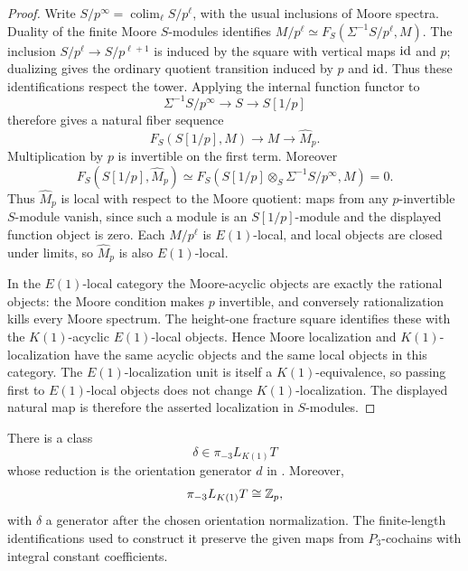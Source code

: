 \begin{proof}
Write \(S/p^\infty=\operatorname*{colim}_\ell S/p^\ell\), with
the usual inclusions of Moore spectra.  Duality of the finite Moore
\(S\)-modules identifies
\(M/p^\ell\simeq F_S(\Sigma^{-1}S/p^\ell,M)\).  The inclusion
\(S/p^\ell\to S/p^{\ell+1}\) is induced by the square with vertical
maps \(\mathrm{id}\) and \(p\); dualizing gives the ordinary quotient
transition induced by \(p\) and \(\mathrm{id}\).  Thus these
identifications respect the tower.  Applying the internal function functor to
\[
 \Sigma^{-1}S/p^\infty\longrightarrow S\longrightarrow S[1/p]
\]
therefore gives a natural fiber sequence
\[
 F_S(S[1/p],M)\longrightarrow M\longrightarrow\widehat M_p.
\]
Multiplication by \(p\) is invertible on the first term.  Moreover
\[
 F_S(S[1/p],\widehat M_p)
 \simeq F_S(S[1/p]\otimes_S\Sigma^{-1}S/p^\infty,M)=0.
\]
Thus \(\widehat M_p\) is local with respect to the Moore quotient:
maps from any \(p\)-invertible \(S\)-module vanish, since such a
module is an \(S[1/p]\)-module and the displayed function object is
zero.  Each \(M/p^\ell\) is \(E(1)\)-local, and local objects are
closed under limits, so \(\widehat M_p\) is also \(E(1)\)-local.

In the \(E(1)\)-local category the Moore-acyclic objects are exactly
the rational objects: the Moore condition makes \(p\) invertible,
and conversely rationalization kills every Moore spectrum.  The
height-one fracture square identifies these with the \(K(1)\)-acyclic
\(E(1)\)-local objects.  Hence Moore localization and
\(K(1)\)-localization have the same acyclic objects and the same
local objects in this category.  The \(E(1)\)-localization unit is
itself a \(K(1)\)-equivalence, so passing first to \(E(1)\)-local
objects does not change \(K(1)\)-localization.  The displayed natural
map is therefore the asserted localization in \(S\)-modules.
\end{proof}

\begin{proposition}\label{h3:prop:integral-delta}
There is a class
\[
 \delta\in\pi_{-3}L_{K(1)}T
\]
whose reduction is the orientation generator \(d\)
in .
Moreover,
\[
 \pi_{-3}L_{K(1)}T\cong\mathbb Z_p,
\]
with \(\delta\) a generator after the chosen orientation
normalization.  The finite-length identifications used
to construct it preserve the given maps from
\(P_3\)-cochains with integral constant coefficients.
\end{proposition}

